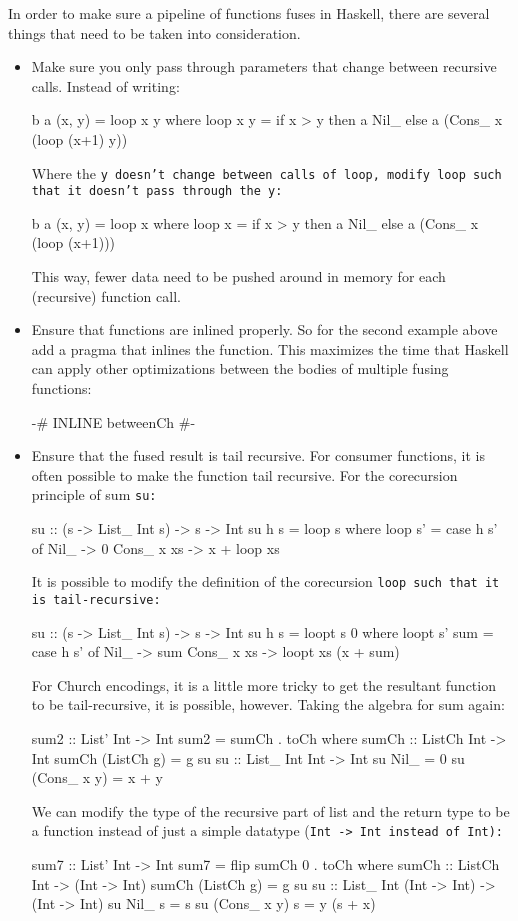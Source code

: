In order to make sure a pipeline of functions fuses in Haskell, there are several things that need to be taken into consideration.
\begin{itemize}[noitemsep]
    \item Make sure you only pass through parameters that change between recursive calls. Instead of writing:
    \begin{spec}
b a (x, y) = loop x y
  where loop x y = if x > y
                   then a Nil_
                   else a (Cons_ x (loop (x+1) y))
    \end{spec}
    Where the \tt{y} doesn't change between calls of \tt{loop}, modify \tt{loop} such that it doesn't pass through the \tt{y}:
    \begin{spec}
b a (x, y) = loop x
  where loop x = if x > y
                 then a Nil_
                 else a (Cons_ x (loop (x+1)))
    \end{spec}
    This way, fewer data need to be pushed around in memory for each (recursive) function call.
    \item Ensure that functions are inlined properly. So for the second example above add a pragma that inlines the function.
    This maximizes the time that Haskell can apply other optimizations between the bodies of multiple fusing functions:
    \begin{spec}
        {-# INLINE betweenCh #-}
    \end{spec}
    \item Ensure that the fused result is tail recursive.
    For consumer functions, it is often possible to make the function tail recursive.
    For the corecursion principle of sum \tt{su}:
    \begin{spec}
su :: (s -> List_ Int s) -> s -> Int
su h s = loop s
  where loop s' = case h s' of
          Nil_ -> 0
          Cons_ x xs -> x + loop xs
    \end{spec}
    It is possible to modify the definition of the corecursion \tt{loop} such that it is tail-recursive:
    \begin{spec}
su :: (s -> List_ Int s) -> s -> Int
su h s = loopt s 0
  where loopt s' sum = case h s' of
          Nil_ -> sum
          Cons_ x xs -> loopt xs (x + sum)
    \end{spec}
For Church encodings, it is a little more tricky to get the resultant function to be tail-recursive, it is possible, however.
Taking the algebra for sum again:
    \begin{spec}
sum2 :: List' Int -> Int
sum2 = sumCh . toCh
  where sumCh :: ListCh Int -> Int
        sumCh (ListCh g) = g su
        su :: List_ Int Int -> Int
        su Nil_ = 0
        su (Cons_ x y) = x + y
\end{spec}
We can modify the type of the recursive part of list and the return type to be a function instead of just a simple datatype (\tt{Int -> Int} instead of \tt{Int}):
\begin{spec}
sum7 :: List' Int -> Int
sum7 = flip sumCh 0 . toCh
  where sumCh :: ListCh Int -> (Int -> Int)
        sumCh (ListCh g) = g su
        su :: List_ Int (Int -> Int) -> (Int -> Int)
        su Nil_ s = s
        su (Cons_ x y) s = y (s + x)
    \end{spec}


\end{itemize}
